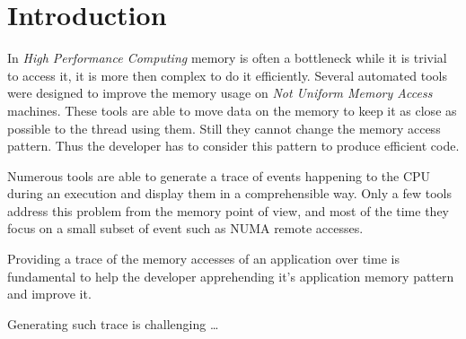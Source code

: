 \section{Introduction}
\label{sec:intro}


In \emph{High Performance Computing} memory is often a bottleneck while it is
trivial to access it, it is more then complex to do it efficiently. Several
automated tools were designed to improve the memory usage on \emph{Not Uniform
Memory Access} machines. These tools are able to move data on the memory to
keep it as close as possible to the thread using them. Still they cannot
change the memory access pattern. Thus the developer has to consider this
pattern to produce efficient code.

Numerous tools are able to generate a trace of events happening to the
CPU during an execution and display them in a comprehensible way. Only a few
tools address this problem from the memory point of view, and most of the time
they focus on a small subset of event such as NUMA remote accesses.

Providing a trace of the memory accesses of an application over time is
fundamental to help the developer apprehending it's application memory pattern
and improve it.

Generating such trace is challenging \ldots
{}


